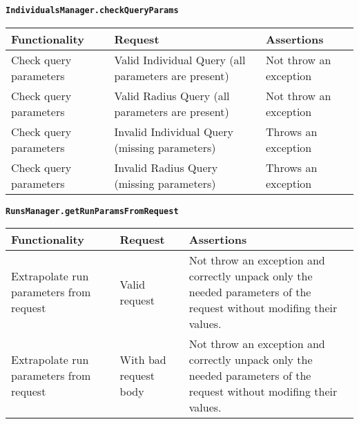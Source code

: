 \noindent\textbf{\texttt{IndividualsManager.checkQueryParams}}  \\
\begin{longtable}{|p{}|p{}|p{}|}

 \hline
    \textbf{Functionality} & \textbf{Request} & \textbf{Assertions} \\
\hline

Check query parameters & Valid Individual Query (all parameters are present) & Not throw an exception \\
\hline

Check query parameters & Valid Radius Query (all parameters are present) & Not throw an exception \\
\hline

Check query parameters & Invalid Individual Query (missing parameters) & Throws an exception \\
\hline

Check query parameters & Invalid Radius Query (missing parameters) & Throws an exception \\
\hline

\end{longtable}

\noindent\textbf{\texttt{RunsManager.getRunParamsFromRequest}}  \\
\begin{longtable}{|p{}|p{}|p{}|}
 \hline
    \textbf{Functionality} & \textbf{Request} & \textbf{Assertions} \\
\hline
Extrapolate run parameters from request & Valid request & Not throw an exception and correctly unpack only the needed parameters of the request without modifing their values. \\
\hline
Extrapolate run parameters from request & With bad request body & Not throw an exception and correctly unpack only the needed parameters of the request without modifing their values.\\
\hline
\end{longtable}


